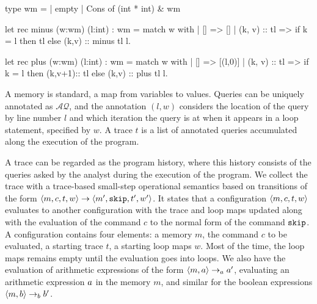 \documentclass[a4paper,11pt]{article}
\begin{document}
\begin{ocaml}{}
type wm = | empty 
            | Cons of (int * int) & wm

let rec  minus (w:wm) (l:int) : wm = 
    match w with 
       | [] => []
       | (k, v) :: tl => 
        if k = l then tl else (k,v) :: minus tl l.   

let rec plus (w:wm) (l:int) : wm = 
    match w with 
       | [] => [(l,0)]
       | (k, v) :: tl => 
        if k = l then (k,v+1):: tl else (k,v) :: plus tl l.         
\end{ocaml}

{
	A memory is standard, a map from variables to values. Queries can be uniquely annotated as $\mathcal{AQ}$, and the annotation $(l,w)$ considers the location of the query by line number $l$ and which iteration the query is at when it appears in a loop statement, specified by $w$. A trace $t$ is a list of annotated queries accumulated along the execution of the program. 
	}

{	 
	A trace can be regarded as the program history, where this history consists of the queries asked by the analyst during the execution of the program. We collect the trace with a trace-based small-step operational semantics based on transitions of the form $ \langle m,c, t, w \rangle \to \langle m', \mathtt{skip}, t', w' \rangle $. 
	It states that a configuration $\langle m, c, t,w \rangle$ evaluates to another configuration with the trace and loop maps updated along with the evaluation of the command $c$ to the normal form of the command $\mathtt{skip}$.  
	A configuration contains four elements: a memory $m$, the command $c$ to be evaluated, a starting trace $t$, a starting loop maps $w$. Most of the time, the loop maps remains empty until the evaluation goes into loops.  
	We also have the evaluation of arithmetic expressions of the form $\langle m,a \rangle \rightarrow_a a' $, evaluating an arithmetic expression $a$ in the memory $m$, and similar for the boolean expressions $\langle m, b \rangle \rightarrow_b b'$.  
  }
\end{document}
